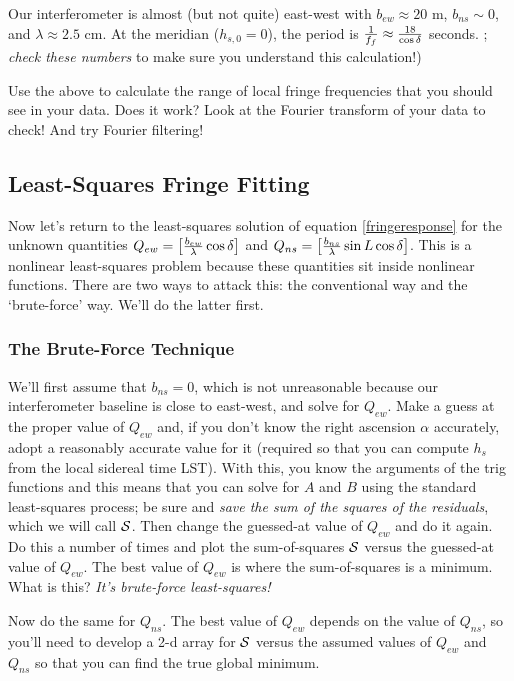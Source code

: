 \documentclass[11pt,preprint]{aastex}
\begin{document}
\noindent Our interferometer is almost (but not quite) east-west
with $b_{ew}\approx 20$ m, $b_{ns} \sim 0$, and $\lambda \approx 2.5$
cm. At the meridian ($h_{s,0}=0$), 
  the period is ${1 \over f_f} \approx
{18 \over \cos \delta}$ seconds. ; {\it check these numbers} to make sure you understand this
calculation!)

Use the above to calculate the range of local fringe frequencies that
you should see in your data. Does it work? Look at the Fourier transform
of your data to check! And try Fourier filtering!

\subsection{Least-Squares Fringe Fitting}

\noindent
Now let's return to the least-squares solution of equation
\ref{fringeresponse} for the unknown quantities $Q_{ew} = \left[{b_{ew}
    \over \lambda} \cos \delta \right]$ and $Q_{ns}= \left[{b_{ns} \over
    \lambda} \sin L \cos \delta \right]$.
This is a nonlinear least-squares problem because these quantities sit
inside nonlinear functions. There are two ways to attack this: the
conventional way and the `brute-force' way. We'll do the latter first.

\subsubsection{The Brute-Force Technique}

\noindent
We'll first assume that $b_{ns}=0$, which is not unreasonable because
our interferometer baseline is close to east-west, and solve for
$Q_{ew}$. Make a guess at the proper value of $Q_{ew}$ and, if you don't
know the right ascension $\alpha$ accurately, adopt a reasonably
accurate value for it (required so that you can compute $h_s$ from the
local sidereal time LST).  With this, you know the arguments of the trig
functions and this means that you can solve for $A$ and $B$ using the
standard least-squares process; be sure and {\it save the sum of the
  squares of the residuals}, which we will call $\cal S$.  Then change
the guessed-at value of $Q_{ew}$ and do it again.  Do this a number of
times and plot the sum-of-squares $\cal S$ versus the guessed-at value
of $Q_{ew}$.  The best value of
$Q_{ew}$ is where the sum-of-squares is a minimum.  What is this?  {\it
It's brute-force least-squares!}

Now do the same for $Q_{ns}$. The best value of $Q_{ew}$ depends on the
value of $Q_{ns}$, so you'll need to develop a 2-d array for $\cal S$
versus the assumed values of $Q_{ew}$ and $Q_{ns}$ so that you can find
the true global minimum. 
\end{document}
